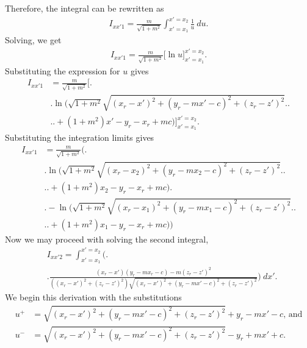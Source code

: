 Therefore, the integral can be rewritten as
\begin{align}
    I_{xx'1} = \frac{m}{\sqrt{1+m^2}} \int_{x'=x_1}^{x'=x_2} \frac{1}{u}\ du \text{.}
\end{align}
Solving, we get
\begin{align}
    I_{xx'1} = \frac{m}{\sqrt{1+m^2}} \Big[ \ln u \Big]_{x'=x_1}^{x'=x_2} \text{.}
\end{align}
Substituting the expression for \(u\) gives
\begin{align}
    I_{xx'1} &= \frac{m}{\sqrt{1+m^2}}\Big[ \Big. \nonumber \\
    & \Big. \ln \big( \sqrt{1+m^2}\sqrt{\left(x_r-x'\right)^2 + \left(y_r-mx'-c\right)^2+\left(z_r-z'\right)^2} \nonumber \big. \Big. \\
    & \Big. \big. + \left(1+m^2\right)x'-y_r-x_r+mc \big) \Big]_{x'=x_1}^{x'=x_2} \text{.}
\end{align}
Substituting the integration limits gives
\begin{align}
    I_{xx'1} &= \frac{m}{\sqrt{1+m^2}}\Big( \Big. \nonumber \\
    & \Big. \ln \big( \sqrt{1+m^2}\sqrt{\left(x_r-x_2\right)^2 + \left(y_r-mx_2-c\right)^2+\left(z_r-z'\right)^2} \nonumber \big. \Big. \\
    & \Big. \big. + \left(1+m^2\right)x_2-y_r-x_r+mc \big) \Big. \nonumber \\
    & \Big. - \ln \big( \sqrt{1+m^2}\sqrt{\left(x_r-x_1\right)^2 + \left(y_r-mx_1-c\right)^2+\left(z_r-z'\right)^2} \nonumber \big. \Big. \\
    & \Big. \big. + \left(1+m^2\right)x_1-y_r-x_r+mc \big) \Big) \nonumber
\end{align}
Now we may proceed with solving the second integral,
\begin{align}
    &I_{xx'2} = \int_{x'=x_1}^{x'=x_2} \Bigg( \Bigg. \nonumber \\
    &\Bigg. \frac{\left(x_r-x'\right)\left(y_r-mx_r-c\right)-m\left(z_r-z'\right)^2}{\left(\left(x_r-x'\right)^2+\left(z_r-z'\right)^2\right)\sqrt{\left(x_r-x'\right)^2+\left(y_r-mx'-c\right)^2+\left(z_r-z'\right)^2}} \Bigg) \ dx' \text{.}
\end{align}
We begin this derivation with the substitutions
\begin{align}
    u^+ &= \sqrt{\left(x_r-x'\right)^2+\left(y_r-mx'-c\right)^2+\left(z_r-z'\right)^2}+y_r-mx'-c \text{, and} \nonumber \\
    u^- &= \sqrt{\left(x_r-x'\right)^2+\left(y_r-mx'-c\right)^2+\left(z_r-z'\right)^2}-y_r+mx'+c \text{.} \nonumber
\end{align}
